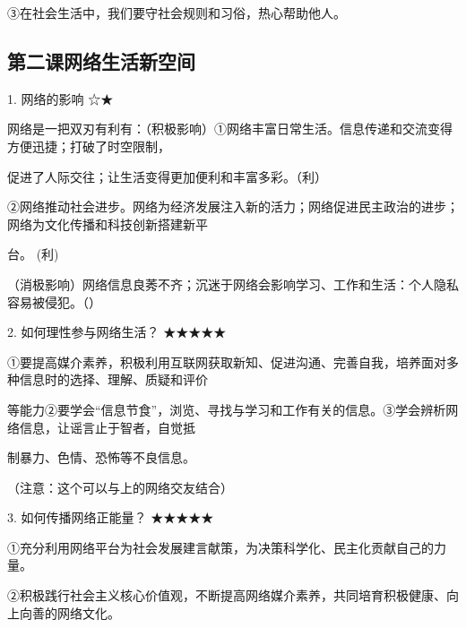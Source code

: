 \documentclass[lang=cn,11pt]{elegantbook}
\newcommand{\daofasym}[1]{{\daofasymbolfont #1}}
\newcommand{\daofasym}[1]{#1}
\begin{document}
\daofasym{③}在社会生活中，我们要守社会规则和习俗，热心帮助他人。\par

\subsection*{第二课网络生活新空间}

1. 网络的影响 \daofasym{☆}\daofasym{★}\par

网络是一把双刃有利有：（积极影响）\daofasym{①}网络丰富日常生活。信息传递和交流变得方便迅捷；打破了时空限制，\par

促进了人际交往；让生活变得更加便利和丰富多彩。（利）\par

\daofasym{②}网络推动社会进步。网络为经济发展注入新的活力；网络促进民主政治的进步；网络为文化传播和科技创新搭建新平\par

台。 (利)\par

（消极影响）网络信息良莠不齐；沉迷于网络会影响学习、工作和生活：个人隐私容易被侵犯。（）\par

2. 如何理性参与网络生活？ \daofasym{★}\daofasym{★}\daofasym{★}\daofasym{★}\daofasym{★}\par

\daofasym{①}要提高媒介素养，积极利用互联网获取新知、促进沟通、完善自我，培养面对多种信息时的选择、理解、质疑和评价\par

等能力\daofasym{②}要学会“信息节食”，浏览、寻找与学习和工作有关的信息。\daofasym{③}学会辨析网络信息，让谣言止于智者，自觉抵\par

制暴力、色情、恐怖等不良信息。\par

（注意：这个可以与上的网络交友结合）\par

3. 如何传播网络正能量？ \daofasym{★}\daofasym{★}\daofasym{★}\daofasym{★}\daofasym{★}\par

\daofasym{①}充分利用网络平台为社会发展建言献策，为决策科学化、民主化贡献自己的力量。\par

\daofasym{②}积极践行社会主义核心价值观，不断提高网络媒介素养，共同培育积极健康、向上向善的网络文化。\par
\end{document}
